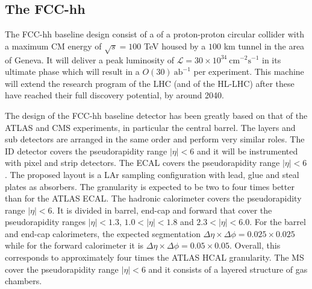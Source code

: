\subsection{The FCC-hh}

The FCC-hh baseline design consist of a of a proton-proton circular collider with a maximum CM energy of $\sqrt{s}=100$ TeV housed by a $100$ km tunnel in the area of Geneva. It will deliver a peak luminosity of $\mathcal{L}=30\times 10^{34}~\text{cm}^{-2}\text{s}^{-1}$ in its ultimate phase which will result in a $O(30)~\text{ab}^{-1}$ per experiment. This machine will extend the research program of the LHC (and of the HL-LHC) after these have reached their full discovery potential, by around 2040.

The design of the FCC-hh baseline detector has been greatly based on that of the ATLAS and CMS experiments, in particular the central barrel. The layers and sub detectors are arranged in the same order and perform very similar roles. The ID detector covers the pseudorapidity range $|\eta|<6$ and it will be instrumented with pixel and strip detectors. The ECAL covers the pseudorapidity range $|\eta|<6$. The proposed layout is a LAr sampling configuration with lead, glue and steal plates as absorbers. The granularity is expected to be two to four times better than for the ATLAS ECAL. The hadronic calorimeter covers the pseudorapidity range $|\eta| < 6$. It is divided in barrel, end-cap and forward that cover the pseudorapidity ranges $|\eta| < 1.3$, $1.0 < |\eta| < 1.8$ and $2.3 < |\eta| < 6.0$. For the barrel and end-cap calorimeters, the expected segmentation $\Delta\eta\times\Delta\phi = 0.025 \times 0.025$ while for the forward calorimeter it is $\Delta\eta\times\Delta\phi = 0.05 \times 0.05$. Overall, this corresponds to approximately four times the ATLAS HCAL granularity. The MS cover the pseudorapidity range $|\eta|<6$ and it consists of a layered structure of gas chambers.